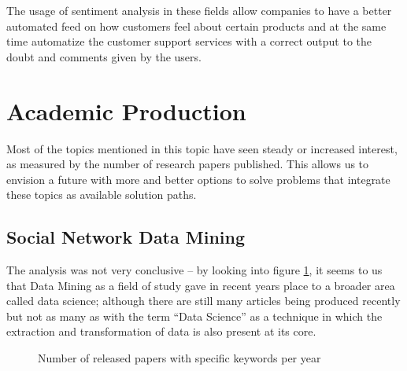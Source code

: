 \documentclass[runningheads]{llncs}
\begin{document}
The usage of sentiment analysis in these fields allow companies to have a better automated feed on how customers feel about certain products and at the same time automatize the customer support services with a correct output to the doubt and comments given by the users. 

\section{Academic Production}

Most of the topics mentioned in this topic have seen steady or increased interest, as measured by the number of research papers published. This allows us to envision a future with more and better options to solve problems that integrate these topics as available solution paths.

\subsection{Social Network Data Mining}

The analysis was not very conclusive – by looking into figure \ref{fig:released_papers_sndm}, it seems to us that Data Mining as a field of study gave in recent years place to a broader area called data science; although there are still many articles being produced recently but not as many as with the term “Data Science” as a technique in which the extraction and transformation of data is also present at its core.

\begin{figure}[htb]
\caption{Number of released papers with specific keywords per year}
\label{fig:released_papers_sndm}
\end{figure}
\end{document}
